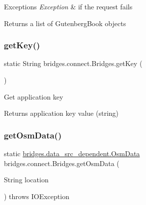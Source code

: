 \begin{DoxyExceptions}{Exceptions}
{\em Exception} & if the request fails\\
\hline
\end{DoxyExceptions}
\begin{DoxyReturn}{Returns}
a list of Gutenberg\+Book objects 
\end{DoxyReturn}
\mbox{\label{classbridges_1_1connect_1_1_bridges_a426897d6e5449601bb4e20c32b8346f5}} 
\subsubsection{\texorpdfstring{get\+Key()}{getKey()}}
{\footnotesize\ttfamily static String bridges.\+connect.\+Bridges.\+get\+Key (\begin{DoxyParamCaption}{ }\end{DoxyParamCaption})\hspace{0.3cm}{\ttfamily [static]}}

Get application key

\begin{DoxyReturn}{Returns}
application key value (string) 
\end{DoxyReturn}
\mbox{\label{classbridges_1_1connect_1_1_bridges_a25bb61cd96bd844c01a1658a02a295b3}} 
\subsubsection{\texorpdfstring{get\+Osm\+Data()}{getOsmData()}}
{\footnotesize\ttfamily static \mbox{\hyperlink{classbridges_1_1data__src__dependent_1_1_osm_data}{bridges.\+data\+\_\+src\+\_\+dependent.\+Osm\+Data}} bridges.\+connect.\+Bridges.\+get\+Osm\+Data (\begin{DoxyParamCaption}\item[{String}]{location }\end{DoxyParamCaption}) throws I\+O\+Exception\hspace{0.3cm}{\ttfamily [static]}}

